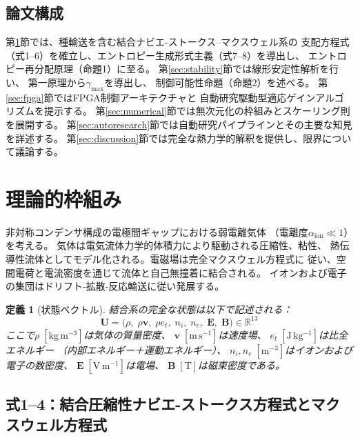 \documentclass[12pt,twocolumn]{ltjsarticle}
\newtheorem{definition}{定義}
\newcommand{\ee}{\mathbf{E}}
\newcommand{\bb}{\mathbf{B}}
\newcommand{\vv}{\mathbf{v}}
\newcommand{\uu}{\mathbf{U}}
\begin{document}
\subsection{論文構成}

第\ref{sec:theory}節では、種輸送を含む結合ナビエ-ストークス--マクスウェル系の
支配方程式（式1--6）を確立し、エントロピー生成形式主義（式7--8）を導出し、
エントロピー再分配原理（命題1）に至る。
第\ref{sec:stability}節では線形安定性解析を行い、
第一原理から$\gamma_{\max}$を導出し、
制御可能性命題（命題2）を述べる。
第\ref{sec:fpga}節ではFPGA制御アーキテクチャと
自動研究駆動型適応ゲインアルゴリズムを提示する。
第\ref{sec:numerical}節では無次元化の枠組みとスケーリング則を展開する。
第\ref{sec:autoresearch}節では自動研究パイプラインとその主要な知見を詳述する。
第\ref{sec:discussion}節では完全な熱力学的解釈を提供し、限界について議論する。

\section{理論的枠組み}
\label{sec:theory}

非対称コンデンサ構成の電極間ギャップにおける弱電離気体
（電離度$\alpha_{\mathrm{ion}} \ll 1$）を考える。
気体は電気流体力学的体積力により駆動される圧縮性、粘性、
熱伝導性流体としてモデル化される。電磁場は完全マクスウェル方程式に
従い、空間電荷と電流密度を通じて流体と自己無撞着に結合される。
イオンおよび電子の集団はドリフト-拡散-反応輸送に従い発展する。

\begin{definition}[状態ベクトル]
\label{def:state}
結合系の完全な状態は以下で記述される：
\begin{equation*}
  \uu = \bigl(\rho,\; \rho\vv,\; \rho e_t,\;
    n_i,\; n_e,\; \ee,\; \bb\bigr)
  \in \mathbb{R}^{13}
\end{equation*}
ここで$\rho\;[\mathrm{kg\,m^{-3}}]$は気体の質量密度、
$\vv\;[\mathrm{m\,s^{-1}}]$は速度場、
$e_t\;[\mathrm{J\,kg^{-1}}]$は比全エネルギー
（内部エネルギー＋運動エネルギー）、
$n_i, n_e\;[\mathrm{m^{-3}}]$はイオンおよび電子の数密度、
$\ee\;[\mathrm{V\,m^{-1}}]$は電場、
$\bb\;[\mathrm{T}]$は磁束密度である。
\end{definition}

\subsection{式1--4：結合圧縮性ナビエ-ストークス方程式とマクスウェル方程式}
\label{sec:theory:NS_Maxwell}
\end{document}
